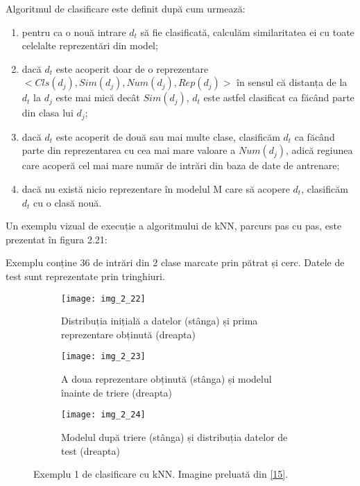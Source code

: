 Algoritmul de clasificare este definit după cum urmează:
\begin{enumerate}
	\item pentru ca o nouă intrare $d_t$ să fie clasificată, calculăm similaritatea ei cu toate celelalte reprezentări din model;
	\item dacă $d_t$ este acoperit doar de o reprezentare $<Cls(d_j), Sim(d_j), Num(d_j), Rep(d_j)>$ în sensul că distanța de la $d_t$ la $d_j$ este mai mică decât $Sim(d_j)$, $d_t$ este astfel clasificat ca făcând parte din clasa lui $d_j$;
	\item dacă $d_t$ este acoperit de două sau mai multe clase, clasificăm $d_t$ ca făcând parte din reprezentarea cu cea mai mare valoare a $Num(d_j)$, adică regiunea care acoperă cel mai mare număr de intrări din baza de date de antrenare;
	\item dacă nu există nicio reprezentare în modelul M care să acopere $d_t$, clasificăm $d_t$ cu o clasă nouă.
\end{enumerate}

Un exemplu vizual de execuție a algoritmului de kNN, parcurs pas cu pas, este prezentat în figura 2.21:

Exemplu conține 36 de intrări din 2 clase marcate prin pătrat și cerc. Datele de test sunt reprezentate prin tringhiuri.
\begin{figure}[!tbp]
  \begin{subfigure}[b]{0.4\textwidth}
    \texttt{[image: img\_2\_22]}
    \caption{Distribuția inițială a datelor (stânga) și prima reprezentare obținută (dreapta)}
    \label{fig:f1}
  \end{subfigure}
  \hfill
  \begin{subfigure}[b]{0.4\textwidth}
    \texttt{[image: img\_2\_23]}
    \caption{A doua reprezentare obținută (stânga) și modelul înainte de triere (dreapta)}
    \label{fig:f2}
  \end{subfigure}
  \hfill
  \begin{subfigure}[b]{0.4\textwidth}
    \texttt{[image: img\_2\_24]}
    \caption{Modelul după triere (stânga) și distribuția datelor de test (dreapta)}
    \label{fig:f3}
  \end{subfigure}
  \caption[Exemplu 1 de clasificare cu kNN]{Exemplu 1 de clasificare cu kNN. Imagine preluată din \hyperlink{gongdeguo}{[15]}.}
\end{figure}  

